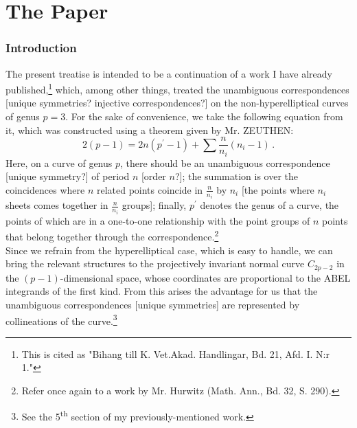 \documentclass[leqno]{article}
\begin{document}
\part*{The Paper}
\section*{Introduction}
The present treatise is intended to be a continuation of a work I have already published,\footnote{This is cited as "Bihang till K. Vet.Akad. Handlingar, Bd. 21, Afd. I. N:r 1."} which, among other things, treated the unambiguous correspondences [unique symmetries? injective correspondences?] on the non-hyperelliptical curves of genus $p = 3$. 
For the sake of convenience, we take the following equation from it, which was constructed using a theorem given by Mr. ZEUTHEN:
\begin{equation}\label{eq: A}
2(p-1) = 2n(p^\prime-1) + \sum \frac{n}{n_i}(n_i-1) \, . \tag{A}
\end{equation}
Here, on a curve of genus $p$, there should be an unambiguous correspondence [unique symmetry?] of period $n$ [order $n$?]; the summation is over the coincidences where $n$ related points coincide in $\frac{n}{n_i}$ by $n_i$ [the points where $n_i$ sheets comes together in $\frac{n}{n_i}$ groups]; finally, $p^\prime$ denotes the genus of a curve, the points of which are in a one-to-one relationship with the point groups of $n$ points that belong together through the correspondence.\footnote{Refer once again to a work by Mr. Hurwitz (Math. Ann., Bd. 32, S. 290).} \\
Since we refrain from the hyperelliptical case, which is easy to handle, we can bring the relevant structures to the projectively invariant normal curve $C_{2p-2}$ in the $ (p-1) $-dimensional space, whose coordinates are proportional to the ABEL integrands of the first kind. From this arises the advantage for us that the unambiguous correspondences [unique symmetries] are represented by collineations of the curve.\footnote{See the 5\textsuperscript{th} section of my previously-mentioned work.}
\end{document}

